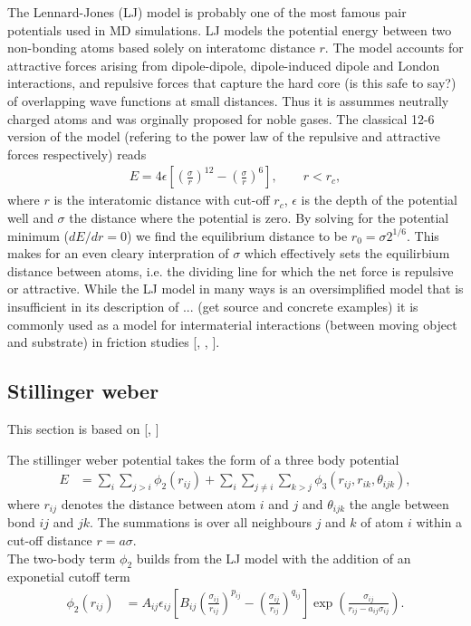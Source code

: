 The Lennard-Jones (LJ) model is probably one of the most famous pair potentials
used in MD simulations. LJ models the potential energy between two non-bonding
atoms based solely on interatomc distance $r$. The model accounts for attractive
forces arising from dipole-dipole, dipole-induced dipole and London
interactions, and repulsive forces that capture the hard core (is this safe to
say?) of overlapping wave functions at small distances. Thus it is assummes
neutrally charged atoms and was orginally proposed for noble gases. The
classical 12-6 version of the model (refering to the power law of the repulsive
and attractive forces respectively) reads
\begin{align}
  E = 4\epsilon \left[\left(\frac{\sigma}{r}\right)^{12} - \left(\frac{\sigma}{r}\right)^6 \right ], \qquad r < r_c,
  \label{eq:LJ}
\end{align}
where $r$ is the interatomic distance with cut-off $r_c$, $\epsilon$ is the
depth of the potential well and $\sigma$ the distance where the potential is
zero. By solving for the potential minimum ($dE/dr = 0$) we find the equilibrium
distance to be $r_0 = \sigma 2^{1/6}$. This makes for an even cleary
interpration of $\sigma$ which effectively sets the equilirbium distance between
atoms, i.e. the dividing line for which the net force is repulsive or
attractive. While the LJ model in many ways is an oversimplified model that is
insufficient in its description of ... (get source and concrete examples) it is
commonly used as a model for intermaterial interactions (between moving object
and substrate) in friction studies [\cite{li_evolving_2016}, \cite{ZHANG201585},
\cite{kim_nano-scale_2009}].


\subsection{Stillinger weber}
This section is based on [\cite{docs_lammps_sw}, \cite{PhysRevB.31.5262}]

The stillinger weber potential takes the form of a three body potential
\begin{align*}
  E &=\sum_i \sum_{j>i} \phi_2(r_{i j})+\sum_i \sum_{j \neq i} \sum_{k>j} \phi_3(r_{ij}, r_{ik}, \theta_{ijk}),
\end{align*}
where $r_{ij}$ denotes the distance between atom $i$ and $j$ and $\theta_{ijk}$
the angle between bond $ij$ and $jk$. The summations is over all neighbours $j$
and $k$ of atom $i$ within a cut-off distance $r = a\sigma$. \\
The two-body term $\phi_2$ builds from the LJ model with the addition of an
exponetial cutoff term
\begin{align}
  \phi_2(r_{i j}) & =A_{ij} \epsilon_{ij}\left[B_{ij}\left(\frac{\sigma_{ij}}{r_{ij}}\right)^{p_{ij}} - \left(\frac{\sigma_{ij}}{r_{ij}}\right)^{q_{ij}}\right] \exp (\frac{\sigma_{ij}}{r_{ij}-a_{ij} \sigma_{ij}}).
  \label{eq:sw_2}
\end{align}

